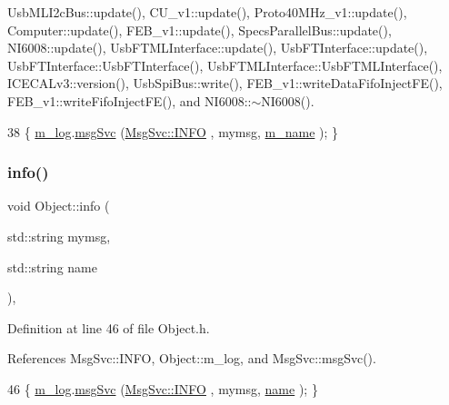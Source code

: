Usb\+M\+L\+I2c\+Bus\+::update(), C\+U\+\_\+v1\+::update(), Proto40\+M\+Hz\+\_\+v1\+::update(), Computer\+::update(), F\+E\+B\+\_\+v1\+::update(), Specs\+Parallel\+Bus\+::update(), N\+I6008\+::update(), Usb\+F\+T\+M\+L\+Interface\+::update(), Usb\+F\+T\+Interface\+::update(), Usb\+F\+T\+Interface\+::\+Usb\+F\+T\+Interface(), Usb\+F\+T\+M\+L\+Interface\+::\+Usb\+F\+T\+M\+L\+Interface(), I\+C\+E\+C\+A\+Lv3\+::version(), Usb\+Spi\+Bus\+::write(), F\+E\+B\+\_\+v1\+::write\+Data\+Fifo\+Inject\+F\+E(), F\+E\+B\+\_\+v1\+::write\+Fifo\+Inject\+F\+E(), and N\+I6008\+::$\sim$\+N\+I6008().


\begin{DoxyCode}
38 \{ \hyperlink{classObject_a0d269813dd7ac1f24bc143031e2963f2}{m\_log}.\hyperlink{classMsgSvc_ad25f18047920cc59a314e5098259711c}{msgSvc} (\hyperlink{classMsgSvc_ae671eb7301996cd049d2da8a65925926ad2fcf3f3e734fc41ee097cc23670ce51}{MsgSvc::INFO}    , mymsg, \hyperlink{classObject_a8b83c95c705d2c3ba0d081fe1710f48d}{m\_name} ); \}
\end{DoxyCode}
\mbox{\label{classObject_a1ca123253dfd30fc28b156f521dcbdae}} 
\subsubsection{\texorpdfstring{info()}{info()}\hspace{0.1cm}{\footnotesize\ttfamily [2/2]}}
{\footnotesize\ttfamily void Object\+::info (\begin{DoxyParamCaption}\item[{std\+::string}]{mymsg,  }\item[{std\+::string}]{name }\end{DoxyParamCaption})\hspace{0.3cm}{\ttfamily [inline]}, {\ttfamily [inherited]}}



Definition at line 46 of file Object.\+h.



References Msg\+Svc\+::\+I\+N\+FO, Object\+::m\+\_\+log, and Msg\+Svc\+::msg\+Svc().


\begin{DoxyCode}
46 \{ \hyperlink{classObject_a0d269813dd7ac1f24bc143031e2963f2}{m\_log}.\hyperlink{classMsgSvc_ad25f18047920cc59a314e5098259711c}{msgSvc} (\hyperlink{classMsgSvc_ae671eb7301996cd049d2da8a65925926ad2fcf3f3e734fc41ee097cc23670ce51}{MsgSvc::INFO}    , mymsg, \hyperlink{classObject_a300f4c05dd468c7bb8b3c968868443c1}{name} ); \}
\end{DoxyCode}
\mbox{\label{classSeqPGA_aba1ead90de9e6f14042d8838db5ebe5b}} 
